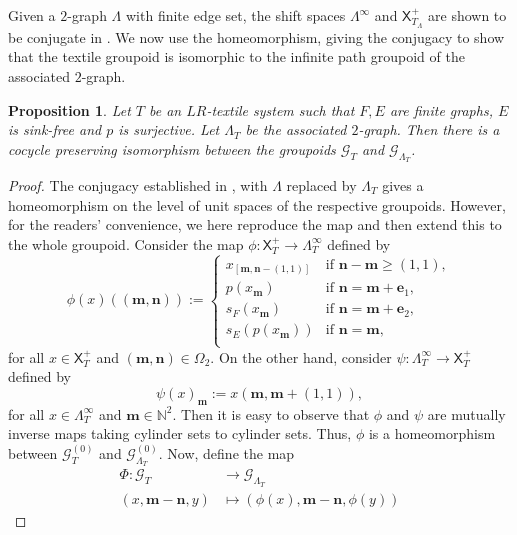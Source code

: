 \documentclass[a4paper,reqno,12pt]{amsart}
\newcommand{\N}{\mathbf{n}}
\newcommand{\M}{\mathbf{m}}
\newcommand{\Xs}{\mathsf{X}}
\newcommand{\ea}{\mathbf{e}_1}
\newcommand{\eb}{\mathbf{e}_2}
\newtheorem{prop}[thm]{Proposition}
\theoremstyle{definition}
\theoremstyle{remark}
\begin{document}
Given a $2$-graph $\Lambda$ with finite edge set, the shift spaces $\Lambda^\infty$ and $\Xs_{T_\Lambda}^+$ are shown to be conjugate in \cite[Lemma 4.11]{BGGLPP}. We now use the homeomorphism, giving the conjugacy to show that the textile groupoid is isomorphic to the infinite path groupoid of the associated $2$-graph.
\begin{prop}\label{pro textile groupoid is isomorphic to path groupoid}
Let $T$ be an $LR$-textile system such that $F,E$ are finite graphs, $E$ is sink-free and $p$ is surjective. Let $\Lambda_T$ be the associated $2$-graph. Then there is a cocycle preserving isomorphism between the groupoids $\mathcal{G}_T$ and $\mathcal{G}_{\Lambda_T}$.
\end{prop}
\begin{proof}
The conjugacy established in \cite[Lemma 4.11]{BGGLPP}, with $\Lambda$ replaced by $\Lambda_T$ gives a homeomorphism on the level of unit spaces of the respective groupoids. However, for the readers' convenience, we here reproduce the map and then extend this to the whole groupoid. Consider the map $\phi:\Xs_T^+\longrightarrow \Lambda_T^\infty$ defined by 
\[\phi(x)((\M,\N)):=
	\left\{
	\begin{array}{llll}
		x_{[\M,\N-(1,1)]}  & \mbox{if } \N-\M\ge (1,1), \\
		p(x_\M) & \mbox{if }  \N=\M+\ea,\\
        s_F(x_\M) & \mbox{if }  \N=\M+\eb,\\
         s_E(p(x_\M)) & \mbox{if } \N=\M,\\
	\end{array}
	\right.
\] for all $x\in \Xs_T^+$ and $(\M,\N)\in \Omega_2$. On the other hand, consider $\psi:\Lambda_T^\infty\longrightarrow \Xs_T^+$ defined by \[\psi(x)_\M:=x(\M,\M+(1,1)),\] for all $x\in \Lambda_T^\infty$ and $\M\in \mathbb{N}^2$. Then it is easy to observe that $\phi$ and $\psi$ are mutually inverse maps taking cylinder sets to cylinder sets. Thus, $\phi$ is a homeomorphism between $\mathcal{G}_T^{(0)}$ and $\mathcal{G}_{\Lambda_T}^{(0)}$. Now, define the map 
\begin{align*}
    \Phi:\mathcal{G}_{T}&\longrightarrow \mathcal{G}_{\Lambda_T}\\
    (x,\M-\N,y)&\longmapsto (\phi(x),\M-\N,\phi(y))
\end{align*} 

\end{proof}
\end{document}
